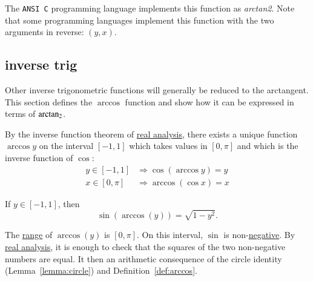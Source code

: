 The {\tt ANSI C} programming language implements this function as {\it
  arctan2}.  Note that some programming languages implement this
function with the two arguments in reverse: $(y,x)$.
%
%
%
%


\subsection{inverse trig}
%
Other inverse trigonometric functions will generally be reduced to the
arctangent.  This section defines the $\arccos$ function and show how
it can be expressed in terms of ${\operatorname{arctan_2}}$.

\begin{definition}[arccos]
\label{def:arccos}
  By the inverse function theorem of \hyperref[back:analysis]{real
    analysis}, there exists a unique function $\arccos y$ on the
  interval $[-1,1]$ which takes values in $[0,\pi]$ and which is the
  inverse function of $\cos$:
\begin{displaymath}\begin{array}{lll}
y\in [-1,1] &\Rightarrow \cos(\arccos y) = y\\
x\in[0,\pi] &\Rightarrow \arccos(\cos x) = x
\end{array}\end{displaymath}
%
%
\end{definition}

\begin{lemma}[]\label{lemma:sin-arccos}
  If $y\in[-1,1]$, then
\begin{displaymath}\sin(\arccos(y)) = \sqrt{1-y^2}.\end{displaymath}
\end{lemma}

\begin{proved}
  The \hyperref[def:arccos]{range} of $\arccos(y)$ is $[0,\pi]$.  On
  this interval, $\sin$ is non-\hyperref[lemma:sin-pos]{negative}.  By
  \hyperref[back:analysis]{real analysis}, it is enough to check that
  the squares of the two non-negative numbers are equal.  It then an
  arithmetic consequence of the circle identity
  (Lemma~\ref{lemma:circle}) and Definition~\ref{def:arccos}.
  \swallowed\end{proved}


